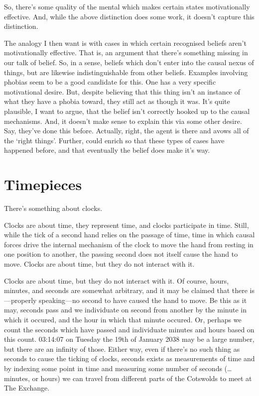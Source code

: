 \documentclass[10pt]{article}
\begin{document}
So, there's some quality of the mental which makes certain states motivationally effective.
And, while the above distinction does some work, it doesn't capture this distinction.

The analogy I then want is with cases in which certain recognised beliefs aren't motivationally effective.
That is, an argument that there's something missing in our talk of belief.
So, in a sense, beliefs which don't enter into the causal nexus of things, but are likewise indistinguishable from other beliefs.
Examples involving phobias seem to be a good candidate for this.
One has a very specific motivational desire.
But, despite believing that this thing isn't an instance of what they have a phobia toward, they still act as though it was.
It's quite plausible, I want to argue, that the belief isn't correctly hooked up to the causal mechanisms.
And, it doesn't make sense to explain this via some other desire.
Say, they've done this before.
Actually, right, the agent is there and avows all of the `right things'.
Further, could enrich so that these types of cases have happened before, and that eventually the belief does make it's way.




\section{Timepieces}
\label{sec:timepieces}

There's something about clocks.

Clocks are about time, they represent time, and clocks participate in time.
Still, while the tick of a second hand relies on the passage of time, time in which causal forces drive the internal mechanism of the clock to move the hand from resting in one position to another, the passing second does not itself cause the hand to move.
Clocks are about time, but they do not interact with it.

Clocks are about time, but they do not interact with it.
Of course, hours, minutes, and seconds are somewhat arbitrary, and it may be claimed that there is---properly speaking---no second to have caused the hand to move.
Be this as it may, seconds pass and we individuate on second from another by the minute in which it occured, and the hour in which that minute occured.
Or, perhaps we count the seconds which have passed and individuate minutes and hours based on this count.
03:14:07 on Tuesday the 19th of January 2038 may be a large number, but there are an infinity of those.
Either way, even if there's no such thing as seconds to cause the ticking of clocks, seconds exists as measurements of time and by indexing some point in time and measuring some number of seconds (\dots minutes, or hours) we can travel from different parts of the Cotswolds to meet at The Exchange.
\end{document}

